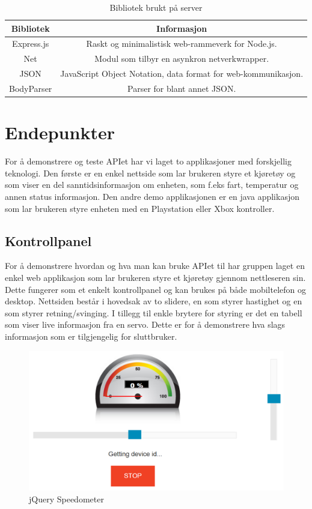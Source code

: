 \documentclass[12pt]{report}
\begin{document}
\begin{table}[H]
	\begin{tabular}{|c|c|}
		\hline 
		\textbf{Bibliotek }& \textbf{Informasjon} \\ 
		\hline 
		Express.js & Raskt og minimalistisk web-rammeverk for Node.js. \\
		\hline 
		Net & Modul som tilbyr en asynkron netverkwrapper. \\
		\hline 
		JSON &  JavaScript Object Notation, data format for web-kommunikasjon. \\
		\hline 
		BodyParser &  Parser for blant annet JSON. \\
		\hline 
	\end{tabular} 
	\centering
	\caption{Bibliotek brukt på server}
	\label{serverBibliotek}
\end{table}

\chapter{Endepunkter}
For å demonstrere og teste APIet har vi laget to applikasjoner med forskjellig teknologi. Den første er en enkel nettside som lar brukeren styre et kjøretøy og som viser en del sanntidsinformasjon om enheten, som f.eks fart, temperatur og annen status informasjon. Den andre demo applikasjonen er en java applikasjon som lar brukeren styre enheten med en Playstation eller Xbox kontroller.

\section{Kontrollpanel}
For å demonstrere hvordan og hva man kan bruke APIet til har gruppen laget en enkel web applikasjon som lar brukeren styre et kjøretøy gjennom nettleseren sin. Dette fungerer som et enkelt kontrollpanel og kan brukes på både mobiltelefon og desktop. Nettsiden består i hovedsak av to slidere, en som styrer hastighet og en som styrer retning/svinging. I tillegg til enkle brytere for styring er det en tabell som viser live informasjon fra en servo. Dette er for å demonstrere hva slags informasjon som er tilgjengelig for sluttbruker.

\begin{figure}[H]
	\includegraphics[scale=0.5]{imgs/Speedometer}
	\centering
	\caption{jQuery Speedometer}
	\label{speed}
\end{figure}
\end{document}
